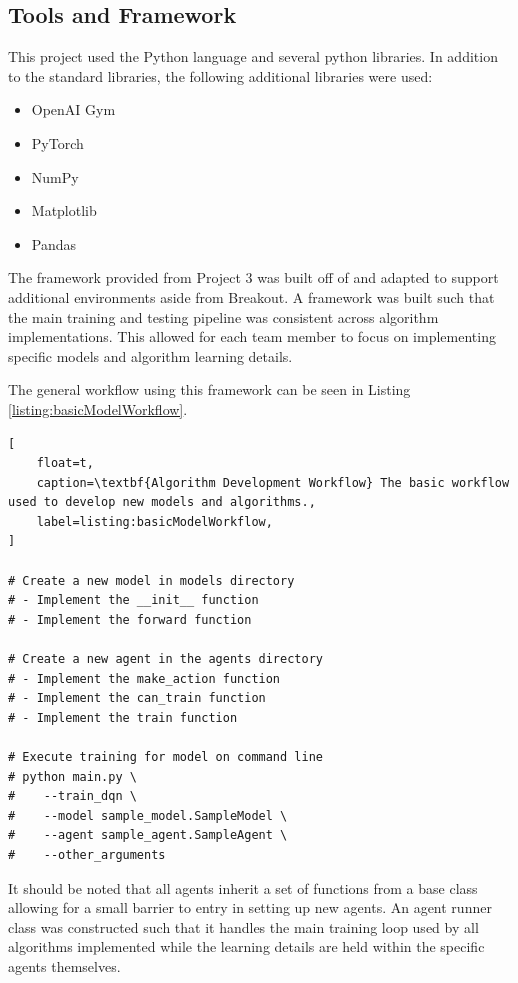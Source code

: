\documentclass[conference]{IEEEtran}
\begin{document}
\subsection{Tools and Framework}
This project used the Python language and several python libraries. 
In addition to the standard libraries, the following additional libraries were used:
 
\begin{itemize}
    \item OpenAI Gym \cite{openaigym}
    \item PyTorch
    \item NumPy
    \item Matplotlib
    \item Pandas
\end{itemize}

The framework provided from Project 3 was built off of and adapted to support additional environments aside from Breakout.
A framework was built such that the main training and testing pipeline was consistent across algorithm implementations.
This allowed for each team member to focus on implementing specific models and algorithm learning details.

The general workflow using this framework can be seen in Listing \ref{listing:basicModelWorkflow}.

\begin{lstlisting}[
    float=t,
    caption=\textbf{Algorithm Development Workflow} The basic workflow used to develop new models and algorithms.,
    label=listing:basicModelWorkflow,
]

# Create a new model in models directory
# - Implement the __init__ function
# - Implement the forward function

# Create a new agent in the agents directory
# - Implement the make_action function
# - Implement the can_train function
# - Implement the train function

# Execute training for model on command line
# python main.py \
#    --train_dqn \
#    --model sample_model.SampleModel \
#    --agent sample_agent.SampleAgent \
#    --other_arguments

\end{lstlisting}

It should be noted that all agents inherit a set of functions from a base class allowing for a small barrier to entry in setting up new agents.
An agent runner class was constructed such that it handles the main training loop used by all algorithms implemented while the learning details are held within the specific agents themselves.
\end{document}
